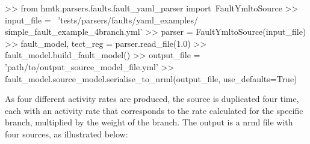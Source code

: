 \begin{python}[frame=single]
>> from hmtk.parsers.faults.fault_yaml_parser import\
    FaultYmltoSource
>> input_file = \
 'tests/parsers/faults/yaml_examples/
  simple_fault_example_4branch.yml'
>> parser = FaultYmltoSource(input_file) 
>> fault_model, tect_reg = parser.read_file(1.0)
>> fault_model.build_fault_model()
>> output_file  = 'path/to/output_source_model_file.yml'
>> fault_model.source_model.serialise_to_nrml(output_file,
                                              use_defaults=True)
\end{python}

As four different activity rates are produced, the source is duplicated four time, each with an activity rate that corresponds to the rate calculated for the specific branch, multiplied by the weight of the branch. The output is a nrml file with four sources, as illustrated below:

